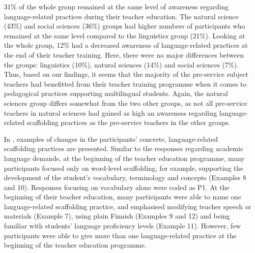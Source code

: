 \documentclass[output=paper]{langscibook}
\begin{document}
31\% of the whole group remained at the same level of awareness regarding language-related practices during their teacher education. The natural science (43\%) and social sciences (36\%) groups had higher numbers of participants who remained at the same level compared to the linguistics group (21\%). Looking at the whole group, 12\% had a decreased awareness of language-related practices at the end of their teacher training. Here, there were no major differences between the groups: linguistics (10\%), natural sciences (14\%) and social sciences (7\%). Thus, based on our findings, it seems that the majority of the pre-service subject teachers had benefitted from their teacher training programme when it comes to pedagogical practices supporting multilingual students. Again, the natural sciences group differs somewhat from the two other groups, as not all pre-service teachers in natural sciences had gained as high an awareness regarding language-related scaffolding practices as the pre-service teachers in the other groups. 

In , examples of changes in the participants’ concrete, language-related scaffolding practices are presented. Similar to the responses regarding academic language demands, at the beginning of the teacher education programme, many participants focused only on word-level scaffolding, for example, supporting the development of the student’s vocabulary, terminology and concepts (Examples 8 and 10). Responses focusing on vocabulary alone were coded as P1. At the beginning of their teacher education, many participants were able to name one language-related scaffolding practice, and emphasised modifying teacher speech or materials (Example 7), using plain Finnish (Examples 9 and 12) and being familiar with students’ language proficiency levels (Example 11). However, few participants were able to give more than one language-related practice at the beginning of the teacher education programme.
\end{document}
